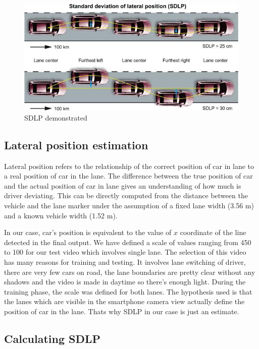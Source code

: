 \begin{figure}[H]
\begin{center}
    \includegraphics[scale=0.6]{img/lane10.png}
\end{center}
\caption{SDLP demonstrated}
\label{fig:lane10}
\end{figure}

\subsection{Lateral position estimation}

Lateral position refers to the relationship of the correct position of car in lane to a real position of car in the lane. The difference between the true position of car and the actual position of car in lane gives an understanding of how much is driver deviating. This can be directly computed from the distance between the vehicle and the lane marker under the assumption of a fixed lane width (3.56 m) and a known vehicle width (1.52 m). 

In our case, car's position is equivalent to the value of $x$ coordinate of the line detected in the final output. We have defined a scale of values ranging from 450 to 100 for our test video which involves single lane. The selection of this video has many reasons for training and testing. It involves lane switching of driver, there are very few cars on road, the lane boundaries are pretty clear without any shadows and the video is made in daytime so there's enough light. During the training phase, the scale was defined for both lanes. The hypothesis used is that the lanes which are visible in the smartphone camera view actually define the position of car in the lane. Thats why SDLP in our case is just an estimate. 

\subsection{Calculating SDLP}


